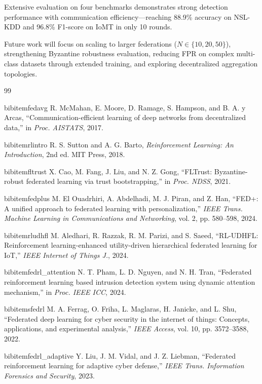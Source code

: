\documentclass[conference]{IEEEtran}
\begin{document}
Extensive evaluation on four benchmarks demonstrates strong detection performance with communication efficiency---reaching 88.9\% accuracy on NSL-KDD and 96.8\% F1-score on IoMT in only 10 rounds.

Future work will focus on scaling to larger federations ($N \in \{10, 20, 50\}$), strengthening Byzantine robustness evaluation, reducing FPR on complex multi-class datasets through extended training, and exploring decentralized aggregation topologies.

\begin{thebibliography}{99}

 bibitem{fedavg}
R. McMahan, E. Moore, D. Ramage, S. Hampson, and B. A. y Arcas, ``Communication-efficient learning of deep networks from decentralized data,'' in \textit{Proc. AISTATS}, 2017.

 bibitem{rlintro}
R. S. Sutton and A. G. Barto, \textit{Reinforcement Learning: An Introduction}, 2nd ed. MIT Press, 2018.

 bibitem{fltrust}
X. Cao, M. Fang, J. Liu, and N. Z. Gong, ``FLTrust: Byzantine-robust federated learning via trust bootstrapping,'' in \textit{Proc. NDSS}, 2021.

 bibitem{fedplus}
M. El Ouadrhiri, A. Abdelhadi, M. J. Piran, and Z. Han, ``FED+: A unified approach to federated learning with personalization,'' \textit{IEEE Trans. Machine Learning in Communications and Networking}, vol. 2, pp. 580--598, 2024.

 bibitem{rludhfl}
M. Aledhari, R. Razzak, R. M. Parizi, and S. Saeed, ``RL-UDHFL: Reinforcement learning-enhanced utility-driven hierarchical federated learning for IoT,'' \textit{IEEE Internet of Things J.}, 2024.

 bibitem{fedrl_attention}
N. T. Pham, L. D. Nguyen, and N. H. Tran, ``Federated reinforcement learning based intrusion detection system using dynamic attention mechanism,'' in \textit{Proc. IEEE ICC}, 2024.

 bibitem{sfedrl}
M. A. Ferrag, O. Friha, L. Maglaras, H. Janicke, and L. Shu, ``Federated deep learning for cyber security in the internet of things: Concepts, applications, and experimental analysis,'' \textit{IEEE Access}, vol. 10, pp. 3572--3588, 2022.

 bibitem{fedrl_adaptive}
Y. Liu, J. M. Vidal, and J. Z. Liebman, ``Federated reinforcement learning for adaptive cyber defense,'' \textit{IEEE Trans. Information Forensics and Security}, 2023.


\end{thebibliography}
\end{document}

